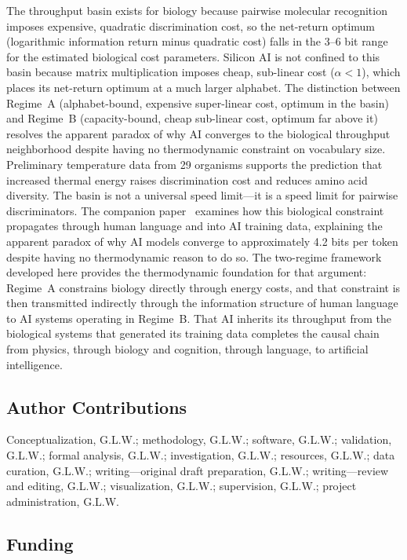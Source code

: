 \documentclass[11pt]{article}
\begin{document}
The throughput basin exists for biology because pairwise molecular recognition imposes expensive, quadratic discrimination cost, so the net-return optimum (logarithmic information return minus quadratic cost) falls in the 3--6 bit range for the estimated biological cost parameters. Silicon AI is not confined to this basin because matrix multiplication imposes cheap, sub-linear cost ($\alpha < 1$), which places its net-return optimum at a much larger alphabet. The distinction between Regime~A (alphabet-bound, expensive super-linear cost, optimum in the basin) and Regime~B (capacity-bound, cheap sub-linear cost, optimum far above it) resolves the apparent paradox of why AI converges to the biological throughput neighborhood despite having no thermodynamic constraint on vocabulary size. Preliminary temperature data from 29 organisms supports the prediction that increased thermal energy raises discrimination cost and reduces amino acid diversity. The basin is not a universal speed limit---it is a speed limit for pairwise discriminators. The companion paper~\cite{whitmer2026inherited} examines how this biological constraint propagates through human language and into AI training data, explaining the apparent paradox of why AI models converge to approximately 4.2 bits per token despite having no thermodynamic reason to do so. The two-regime framework developed here provides the thermodynamic foundation for that argument: Regime~A constrains biology directly through energy costs, and that constraint is then transmitted indirectly through the information structure of human language to AI systems operating in Regime~B. That AI inherits its throughput from the biological systems that generated its training data completes the causal chain from physics, through biology and cognition, through language, to artificial intelligence.

\subsection*{Author Contributions}

Conceptualization, G.L.W.; methodology, G.L.W.; software, G.L.W.; validation, G.L.W.; formal analysis, G.L.W.; investigation, G.L.W.; resources, G.L.W.; data curation, G.L.W.; writing---original draft preparation, G.L.W.; writing---review and editing, G.L.W.; visualization, G.L.W.; supervision, G.L.W.; project administration, G.L.W.

\subsection*{Funding}
\end{document}
